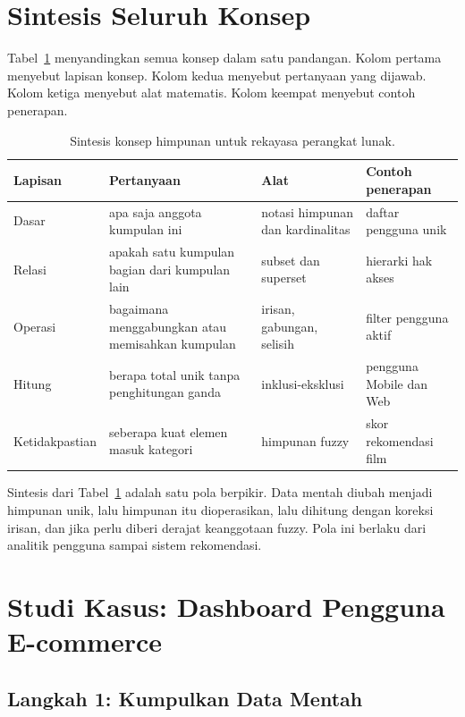 \documentclass[11pt,a4paper]{article}
\begin{document}
\section{Sintesis Seluruh Konsep}

Tabel~\ref{tab:sintesis} menyandingkan semua konsep dalam satu pandangan. Kolom pertama menyebut lapisan konsep. Kolom kedua menyebut pertanyaan yang dijawab. Kolom ketiga menyebut alat matematis. Kolom keempat menyebut contoh penerapan.

\begin{table}[H]
	\centering
	\caption{Sintesis konsep himpunan untuk rekayasa perangkat lunak.}
	\label{tab:sintesis}
	\footnotesize
	\begin{tabularx}{\textwidth}{l X X X}
		\toprule
		Lapisan        & Pertanyaan                                       & Alat                             & Contoh penerapan        \\
		\midrule
		Dasar          & apa saja anggota kumpulan ini                    & notasi himpunan dan kardinalitas & daftar pengguna unik    \\
		Relasi         & apakah satu kumpulan bagian dari kumpulan lain   & subset dan superset              & hierarki hak akses      \\
		Operasi        & bagaimana menggabungkan atau memisahkan kumpulan & irisan, gabungan, selisih        & filter pengguna aktif   \\
		Hitung         & berapa total unik tanpa penghitungan ganda       & inklusi-eksklusi                 & pengguna Mobile dan Web \\
		Ketidakpastian & seberapa kuat elemen masuk kategori              & himpunan fuzzy                   & skor rekomendasi film   \\
		\bottomrule
	\end{tabularx}
\end{table}

Sintesis dari Tabel~\ref{tab:sintesis} adalah satu pola berpikir. Data mentah diubah menjadi himpunan unik, lalu himpunan itu dioperasikan, lalu dihitung dengan koreksi irisan, dan jika perlu diberi derajat keanggotaan fuzzy. Pola ini berlaku dari analitik pengguna sampai sistem rekomendasi.

\section{Studi Kasus: Dashboard Pengguna E-commerce}

\subsection{Langkah 1: Kumpulkan Data Mentah}
\end{document}
